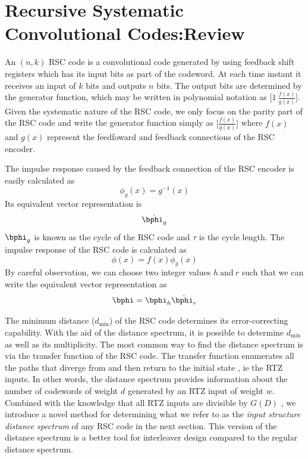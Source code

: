 \section{Recursive Systematic Convolutional Codes:Review}
\label{sec2}

An $(n,k)$ RSC code is a convolutional code generated by using feedback shift registers which has its input bits as part of the codeword. At each time instant it receives an input of $k$ bits and outputs $n$ bits.
The output bits are determined by the generator function, which may be written in polynomial notation as  $\Big[1 ~\frac{f(x)}{g(x)}\Big]$. Given the systematic nature of the RSC code, we only focus on the parity part of the RSC code and write the generator function simply as $\Big[\frac{f(x)}{g(x)}\Big]$ where $f(x)$ and $g(x)$ represent the feedfoward and feedback connections of the RSC encoder.  

The impulse response caused by the feedback connection of the RSC encoder is easily calculated as 
$$\phi_g(x)=g^{-1}(x)$$
Its equivalent vector representation is 
$$\dot{\bphi_g}$$
$\bphi_g$ is known as the cycle of the RSC code and $\tau$ is the cycle length. The impulse response of the RSC code is calculated as $$\phi(x)=f(x)\phi_{g}(x)$$ 
By careful observation, we can choose two integer values $h ~ \text{and}~ r$ such that we can write the equivalent vector representation as $$\bphi=\bphi_h\dot{\bphi_r}$$

The minimum distance ($d_{\text{min}}$) of the RSC code determines its error-correcting capability. With the aid of the distance spectrum, it is possible to determine $d_{\text{min}}$ as well as its multiplicity. The most common way to find the distance spectrum is via the transfer function of the RSC code. The transfer function enumerates all the paths that diverge from and then return to the initial state \cite{ref3}, ie the RTZ inputs. In other words, the distance spectrum provides information about the number of codewords of weight $d$ generated by an RTZ input of weight $w$. Combined with the knowledge that all RTZ inputs are divisible by $G(D)$ \cite{ref6}, we introduce a novel method for determining what we refer to as the  \textit{input structure distance spectrum} of any RSC code in the next section. This version of the distance spectrum is a better tool for interleaver design compared to the regular distance spectrum.

